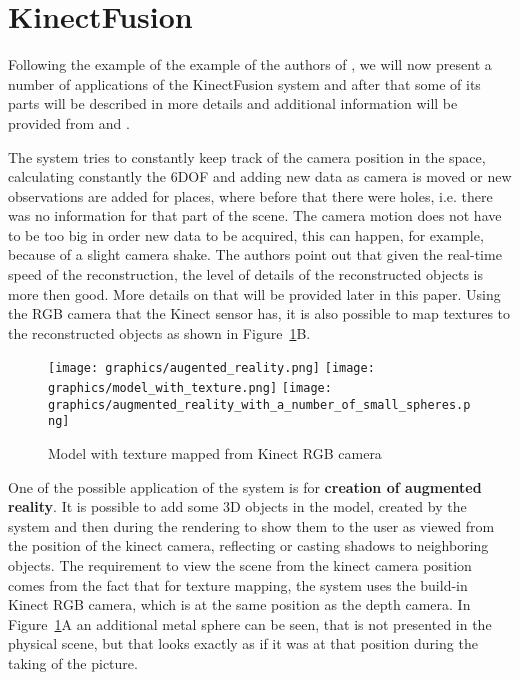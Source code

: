 \documentclass[12pt]{article}
\theoremstyle{plain}
\begin{document}
\section{KinectFusion} %
\label{sec:KinectFusion}
  Following the example of the example of the authors of \cite{kinectfusion}, we
  will now present a number of applications of the KinectFusion system and after
  that some of its parts will be described in more details and additional
  information will be provided from
  \cite{representaion-and-rendering-of-implicit-surfaces} and \cite{icp}.

  The system tries to constantly keep track of the camera position in the space,
  calculating constantly the 6DOF and adding new data as camera is moved or new
  observations are added for places, where before that there were holes, i.e.
  there was no information for that part of the scene. The camera motion does
  not have to be too big in order new data to be acquired, this can happen, for
  example, because of a slight camera shake. The authors point out that given
  the real-time speed of the reconstruction, the level of details of the
  reconstructed objects is more then good. More details on that will be provided
  later in this paper. Using the RGB camera that the Kinect sensor has, it is
  also possible to map textures to the reconstructed objects as shown in
  Figure~\ref{fig:model_with_texture}B.

  \begin{figure}[h]
    \centering
    \caption{Model with texture mapped from Kinect RGB camera}
    \texttt{[image: graphics/augented\_reality.png]}
    \texttt{[image: graphics/model\_with\_texture.png]}
    \texttt{[image: graphics/augmented\_reality\_with\_a\_number\_of\_small\_spheres.png]}
    \label{fig:model_with_texture}
  \end{figure}

  One of the possible application of the system is for \textbf{creation of
  augmented reality}. It is possible to add some 3D objects in the model,
  created by the system and then during the rendering to show them to the user
  as viewed from the position of the kinect camera, reflecting or casting
  shadows to neighboring objects. The requirement to view the scene from the
  kinect camera position comes from the fact that for texture mapping, the
  system uses the build-in Kinect RGB camera, which is at the same position as
  the depth camera.  In Figure~\ref{fig:model_with_texture}A an additional metal
  sphere can be seen, that is not presented in the physical scene, but that
  looks exactly as if it was at that position during the taking of the picture.
\end{document}

